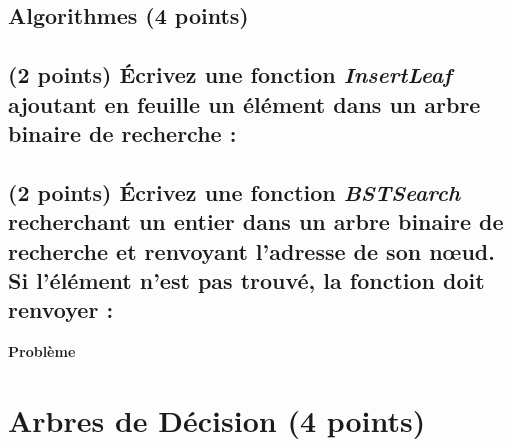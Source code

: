 \documentclass[11pt,a4paper]{article}
\begin{document}

\subsection*{Algorithmes (4 points) }

\subsection{(2 points) \'Ecrivez une fonction \textit{InsertLeaf} ajoutant en feuille un élément dans un arbre binaire de recherche : }

\begin{center}
\end{center}


\subsection{(2 points) \'Ecrivez une fonction \textit{BSTSearch} recherchant un entier dans un arbre binaire de recherche et renvoyant l'adresse de son nœud. Si l'élément n'est pas trouvé, la fonction doit renvoyer  : }

\begin{center}
\end{center}


\clearpage


\vfillFirst

\begin{center}
{\LARGE \textbf{Problème} }
\end{center}

\vfillLast

\clearpage


\vfillFirst

\section{Arbres de Décision (4 points) }

\end{document}

